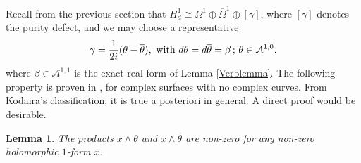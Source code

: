 \documentclass[a4paper]{amsart}
\newtheorem{lemm}[theo]{Lemma}
\theoremstyle{definition}
\newcommand{\Aa}{\mathcal{A}}
\newcommand{\ov}{\overline}
\newcommand{\del}{\partial}
\newcommand{\delb}{{\overline\partial}}
\begin{document}
Recall from the previous section that
$H^1_d\cong \Omega^1\oplus\ov\Omega^1\oplus [\gamma]$,
where $[\gamma]$ denotes the purity defect, and we may choose a representative
\[\gamma={1\over 2i}(\theta-\ov\theta), \text{ with }d\theta=d\ov\theta=\beta\,;\, \theta\in\Aa^{1,0}.\]
where  $\beta\in \Aa^{1,1}$ is the exact real form of Lemma \ref{Verblemma}.
The following property is proven in \cite{Verbook}, \cite{Verb} for complex surfaces with no complex curves. From Kodaira's classification, it is true a posteriori in general. A direct proof would be desirable.

\begin{lemm}\label{omegainj}The products $x\wedge \theta$ and $x\wedge \ov\theta$ are non-zero for any non-zero holomorphic $1$-form $x$.
 \end{lemm}
\end{document}
